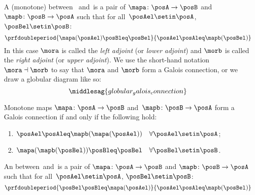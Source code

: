 \begin{ctdefinition}\label{def:monotone-galois-connection}
    A (monotone)  between ~\posA and~\posB is a pair of 
    $\mapa\colon \posA\to \posB$ and~$\mapb\colon \posB\to \posA$ such that for all~$\posAel\setin \posA$,~$\posBel\setin \posB$:
    \begin{equation}
        \prfdoubleperiod{\mapa(\posAel) \posBleq \posBel}{\posAel \posAleq \mapb(\posBel)}
    \end{equation}
  In this case $\mora$ is called the \emph{left adjoint} (or \emph{lower adjoint}) and $\morb$ is called the \emph{right adjoint} (or \emph{upper adjoint}). We use the short-hand notation $\mora \dashv \morb$ to say that $\mora$ and $\morb$ form a Galois connection, or we draw a globular diagram like so:  
    \begin{equation}
    \middlesag{globular_galois_connection}
\end{equation}
\end{ctdefinition}

\begin{lemma}\label{lem:alternative-def-Galois-connection}
Monotone maps $\mapa\colon \posA\to \posB$ and~$\mapb\colon \posB\to \posA$ form a Galois connection if and only if the following hold: 
\begin{enumerate}
\item $\posAel\posAleq \mapb(\mapa(\posAel)) \quad \forall \posAel\setin \posA$;
\item $\mapa(\mapb(\posBel)) \posBleq \posBel \quad \forall \posBel\setin \posB$. 
\end{enumerate}
\end{lemma}


\begin{ctdefinition}\label{def:antitone-galois-connection}
    An  between~\posA and~\posB is a pair of  $\mapa\colon \posA\to \posB$ and $\mapb \colon \posB\to \posA$ such that for all~$\posAel\setin \posA$, $\posBel\setin \posB$:
    \begin{equation}
        \prfdoubleperiod{\posBel \posBleq \mapa(\posAel)}{\posAel \posAleq \mapb(\posBel)}
    \end{equation}
\end{ctdefinition}


